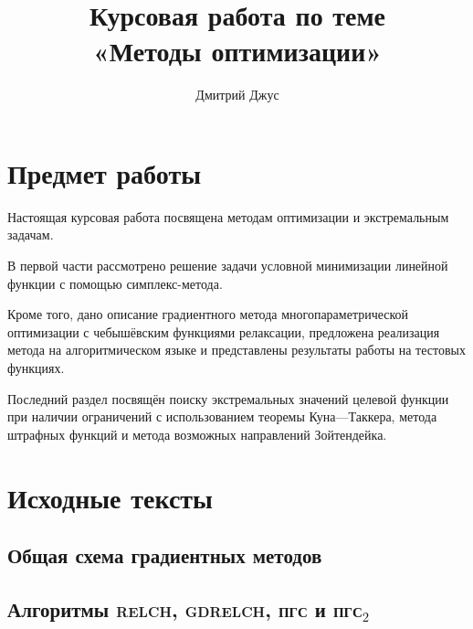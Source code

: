\documentclass{article}
\newcommand{\relch}{\textsc{relch}}
\newcommand{\gdrelch}{\textsc{gdrelch}}
\newcommand{\gd}{\textsc{пгс}}
\newcommand{\rgd}{\textsc{пгс}$_2$}
\theoremstyle{ruthm}
\numberwithin{thm}{section}
\theoremstyle{rurem}
\theoremstyle{rudfn}
\numberwithin{equation}{section}
\begin{document}
\author{Дмитрий Джус}
\title{Курсовая работа по теме \\
  \Huge{«Методы оптимизации»}}
\pretitle{\begin{center}\LARGE}
\posttitle{\par\end{center}\vskip 3pc}
\date{}
\maketitle
\thispagestyle{empty}

\clearpage
\tableofcontents

\listoffigures

\clearpage
\section{Предмет работы}

Настоящая курсовая работа посвящена методам оптимизации и
экстремальным задачам.

В первой части рассмотрено решение задачи условной минимизации
линейной функции с помощью симплекс-метода.

Кроме того, дано описание градиентного метода многопараметрической
оптимизации с чебышёвским функциями релаксации, предложена реализация
метода на алгоритмическом языке и представлены результаты работы на
тестовых функциях.

Последний раздел посвящён поиску экстремальных значений целевой
функции при наличии ограничений с использованием теоремы Куна—Таккера,
метода штрафных функций и метода возможных направлений Зойтендейка.

\clearpage


\clearpage


\clearpage


\clearpage


\clearpage
\appendix
\section{Исходные тексты}
\label{sec:sources}

\subsection{Общая схема градиентных методов}


\subsection{Алгоритмы \relch{}, \gdrelch{}, \gd{} и \rgd{}}

\end{document}
